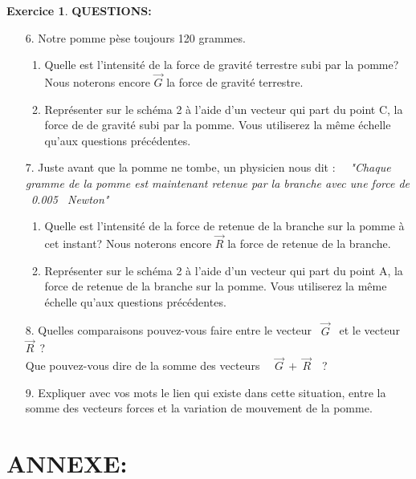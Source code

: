 \documentclass[a4paper,10.9pt]{article}
\theoremstyle{definition}
\newtheorem{exo}{Exercice}
\newcommand{\V}{\overrightarrow}
\begin{document}
\begin{exo}
\textbf{QUESTIONS:}\\
\begin{enumerate}
	\item[6.] Notre pomme pèse toujours 120 grammes.\\
	\begin{enumerate}
		\item Quelle est l'intensité de la force de gravité terrestre subi par la pomme? Nous noterons encore $\V{G}$ la force de gravité terrestre.
		\item Représenter sur le schéma 2 à l'aide d'un vecteur qui part du point C, la force de de gravité subi par la pomme. Vous utiliserez la même échelle qu'aux questions précédentes.\\
	\end{enumerate} 
	\item[7.] Juste avant que la pomme ne tombe, un physicien nous dit : ~~\textit{"Chaque gramme de la pomme est maintenant retenue par la branche avec une force de ~0.005~ Newton"}\\ 
	\begin{enumerate}
		\item Quelle est l'intensité de la force de retenue de la branche sur la pomme à cet instant? Nous noterons encore $\V{R}$ la force de retenue de la branche.
		\item Représenter sur le schéma 2 à l'aide d'un vecteur qui part du point A, la force de retenue de la branche sur la pomme. Vous utiliserez la même échelle qu'aux questions précédentes.\\
	\end{enumerate}
	\item[8.] Quelles comparaisons pouvez-vous faire entre le vecteur ~$\V{G}$~ et le vecteur ~$\V{R}$~? \\Que pouvez-vous dire de la somme des vecteurs ~~$\V{G} \ + \ \V{R}$~~?\\
	\item[9.] Expliquer avec vos mots le lien qui existe dans cette situation, entre la somme  des vecteurs forces et la variation de mouvement de la pomme.
	
	
\end{enumerate}

\newpage
{}\chead{}\renewcommand{\headrulewidth}{0.4pt}\renewcommand{\footrulewidth}{0.4pt}
\section*{ANNEXE:}

\end{exo}
\end{document}
